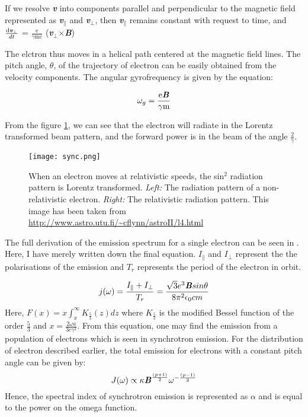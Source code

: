 \documentclass[../main/thesis_msc.tex]{subfiles}
\begin{document}
\noindent If we resolve {\textbf{\textit{v}}} into components parallel and perpendicular to the magnetic field represented as  {\textbf{\textit{v$_{\|}$}}} and {\textbf{\textit{v$_{\bot}$}}}, then {\textbf{\textit{v$_{\|}$}}} remains constant with request to time, and $\frac{ \textrm{d{\textbf{\textit{v$_{\bot}$}}}}}{dt}$ = $\frac{\textrm{e}}{ \gamma \textrm{mc} }$ ({\textbf{\textit{v$_{\bot}$}}}$\times${\textbf{\textit{B}}})

\noindent The elctron thus moves in a helical path centered at the magnetic field lines. The pitch angle, $\theta$, of the trajectory of electron can be easily obtained from the velocity components. The angular gyrofrequency is given by the equation:

\begin{equation}
\omega_g = \frac{\textrm{e}{\textbf{\textit{B}}}}{\gamma \textrm{m}}
\end{equation}

\noindent From the figure \ref{sync}, we can see that the electron will radiate in the Lorentz transformed beam pattern, and the forward power is in the beam of the angle $\frac{2}{\gamma}$.  

\begin{figure}[h]
\centering
\texttt{[image: sync.png]}
\caption{When an electron moves at relativistic speeds, the sin$^2$ radiation pattern is Lorentz transformed. \textit{Left:} The radiation pattern of a non-relativistic electron. \textit{Right:} The relativistic radiation pattern. This image has been taken from \url{http://www.astro.utu.fi/~cflynn/astroII/l4.html}}
\label{sync}
\end{figure}


\noindent The full derivation of the emission spectrum for a single electron can be seen in \citep{longair}. Here, I have merely written down the final equation. $I_{\|}$ and $I_{\bot}$ represent the the polarisations of the emission and $T_r$ represents the period of the electron in orbit.

\begin{equation}
j(\omega) = \frac{I_{\|} + I_{\bot}}{T_r} = \frac{\sqrt{3} e^3 \textbf{\textit{B}} sin \theta }{8 \pi^2 \epsilon_0 cm}
\end{equation}
Here, $F(x) = x \int_x ^{ \infty } K_{\frac{5}{3}} (z) dz$ where $K_{\frac{5}{3}}$  is the modified Bessel function of the order $\frac{5}{3}$ and $x= \frac{2\omega a }{3c \gamma^3}.$
From this equation, one may find the emission from a population of electrons which is seen in synchrotron emission. For the distribution of electron described earlier, the total emission for electrons with a constant pitch angle can be given by:
\begin{equation}
J(\omega) \propto \kappa \textbf{\textit{B}}^{\frac{(p+1)}{2}} \omega^{-\frac{(p-1)}{2}}
\end{equation}
Hence, the spectral index of synchrotron emission is represented as $\alpha$ and is equal to the power on the omega function.
\end{document}
